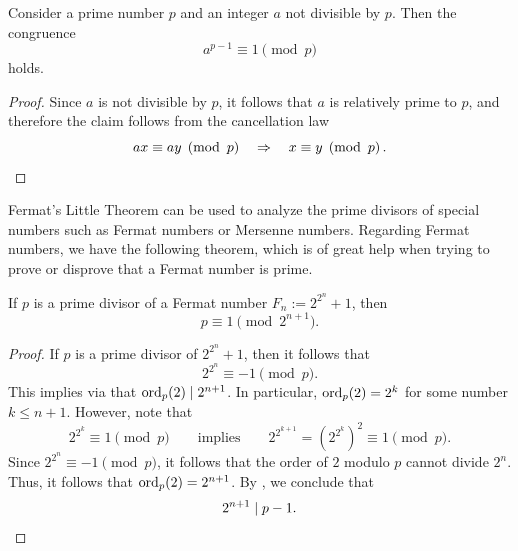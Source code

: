 \begin{corollary}
  Consider a prime number $p$ and an integer $a$ not divisible by $p$. Then the congruence
  \begin{equation*}
    a^{p-1}\equiv 1\pmod{p}
  \end{equation*}
  holds.
\end{corollary}

\begin{proof}
  Since $a$ is not divisible by $p$, it follows that $a$ is relatively prime to $p$, and therefore the claim follows from the cancellation law
  \begin{equation*}
    ax\equiv ay\pmod{p}\quad\Rightarrow\quad x\equiv y\pmod{p}.\qedhere
  \end{equation*}
\end{proof}

Fermat's Little Theorem can be used to analyze the prime divisors of special numbers such as Fermat numbers or Mersenne numbers. Regarding Fermat numbers, we have the following theorem, which is of great help when trying to prove or disprove that a Fermat number is prime.

\begin{theorem}\label{theorem:prime-divisors-fermat-numbers}
  If $p$ is a prime divisor of a Fermat number $F_n:=2^{2^n}+1$, then
  \begin{equation*}
    p\equiv 1\pmod{2^{n+1}}.
  \end{equation*}
\end{theorem}

\begin{proof}
  If $p$ is a prime divisor of $2^{2^n}+1$, then it follows that
  \begin{equation*}
    2^{2^n}\equiv -1\pmod{p}.
  \end{equation*}
  This implies via  that $\ord_p(2)\mid 2^{n+1}$. In particular, $\ord_p(2)=2^k$ for some number $k\leq n+1$. However, note that
  \begin{equation*}
    2^{2^k}\equiv 1\pmod{p}\qquad\text{implies}\qquad 2^{2^{k+1}}= (2^{2^k})^2\equiv 1 \pmod{p}.
  \end{equation*}
  Since $2^{2^{n}}\equiv -1\pmod{p}$, it follows that the order of $2$ modulo $p$ cannot divide $2^n$. Thus, it follows that $\ord_p(2)=2^{n+1}$. By , we conclude that
  \begin{equation*}
    2^{n+1}\mid p-1.\qedhere
  \end{equation*}
\end{proof}

